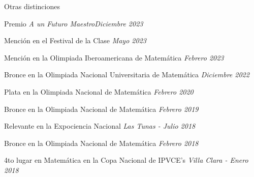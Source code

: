 \documentclass{resume} %
\begin{document}
\newpage

\begin{rSection}{Otras distinciones} \itemsep -6pt
\item Premio {\it A un Futuro Maestro}\hfill {\em Diciembre 2023}
\item Mención en el Festival de la Clase \hfill {\em Mayo 2023}
\item Mención en la Olimpiada Iberoamericana de Matemática \hfill {\em Febrero 2023}
\item Bronce en la Olimpiada Nacional Universitaria de Matemática \hfill {\em Diciembre 2022}
\item Plata en la Olimpiada Nacional de Matemática \hfill {\em Febrero 2020}
\item Bronce en la Olimpiada Nacional de Matemática \hfill {\em Febrero 2019}
\item Relevante en la Expociencia Nacional \hfill {\em Las Tunas - Julio 2018}
\item Bronce en la Olimpiada Nacional de Matemática \hfill {\em Febrero 2018}
\item 4to lugar en Matemática en la Copa Nacional de IPVCE's \hfill {\em Villa Clara - Enero 2018}
\end{rSection}
\end{document}
